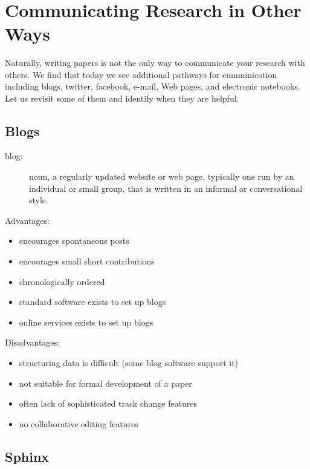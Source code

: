 \FILENAME\

\section{Communicating Research in Other Ways}\label{communicating-research}

Naturally, writing papers is not the only way to communicate your
research with others. We find that today we see additional pathways
for cumminication including blogs, twitter, facebook, e-mail, Web
pages, and electronic notebooks. Let us revisit some of them and
identify when they are helpful.

\subsection{Blogs}\label{blogs}

\begin{description}
\item[blog:]
noun, a regularly updated website or web page, typically one run by an
individual or small group, that is written in an informal or
conversational style.
\end{description}

Advantages:

\begin{itemize}

\item
  encourages spontaneous posts
\item
  encourages small short contributions
\item
  chronologically ordered
\item
  standard software exists to set up blogs
\item
  online services exists to set up blogs
\end{itemize}

Disadvantages:

\begin{itemize}

\item
  structuring data is difficult (some blog software support it)
\item
  not suitable for formal development of a paper
\item
  often lack of sophisticated track change features
\item
  no collaborative editing features
\end{itemize}

\subsection{Sphinx}\label{sphinx}

